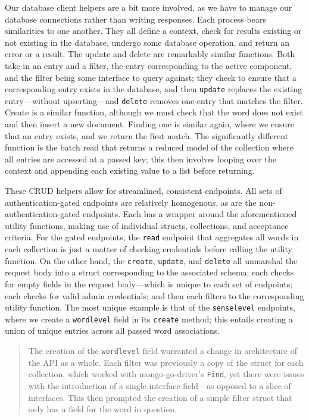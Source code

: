 \documentclass[11pt, twoside, reqno]{book}
\begin{document}
Our database client helpers are a bit more involved, as we have to manage our database connections rather than writing responses. Each process bears similarities to one another. They all define a context, check for results existing or not existing in the database, undergo some database operation, and return an error or a result. The update and delete are remarkably similar functions. Both take in an entry and a filter, the entry corresponding to the active component, and the filter being some interface to query against; they check to ensure that a corresponding entry exists in the database, and then \texttt{update} replaces the existing entry—without upserting—and \texttt{delete} removes one entry that matches the filter. Create is a similar function, although we must check that the word does \textit{}not\textit{} exist and then insert a new document. Finding one is similar again, where we ensure that an entry exists, and we return the first match. The significantly different function is the batch read that returns a reduced model of the collection where all entries are accessed at a passed key; this then involves looping over the context and appending each existing value to a list before returning.

These CRUD helpers allow for streamlined, consistent endpoints. All sets of authentication-gated endpoints are relatively homogenous, as are the non-authentication-gated endpoints. Each has a wrapper around the aforementioned utility functions, making use of individual structs, collections, and acceptance criteria. For the gated endpoints, the \texttt{read} endpoint that aggregates all words in each collection is just a matter of checking credentials before calling the utility function. On the other hand, the \texttt{create}, \texttt{update}, and \texttt{delete} all unmarshal the request body into a struct corresponding to the associated schema; each checks for empty fields in the request body—which is unique to each set of endpoints; each checks for valid admin credentials; and then each filters to the corresponding utility function. The most unique example is that of the \texttt{senselevel} endpoints, where we create a \texttt{wordlevel} field in its \texttt{create} method; this entails creating a union of unique entries across all passed word associations.

\begin{quote}
The creation of the \texttt{wordlevel} field warranted a change in architecture of the API as a whole. Each filter was previously a copy of the struct for each collection, which worked with mongo-go-driver's \texttt{Find}, yet there were issues with the introduction of a single interface field—as opposed to a slice of interfaces. This then prompted the creation of a simple filter struct that only has a field for the word in question.
\end{quote}
\end{document}
